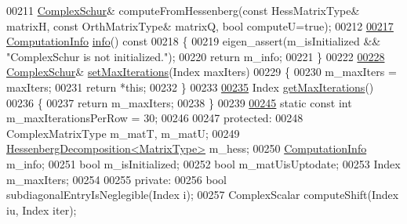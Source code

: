 \begin{DoxyCode}
00211     \hyperlink{group___eigenvalues___module_class_eigen_1_1_complex_schur}{ComplexSchur}& computeFromHessenberg(\textcolor{keyword}{const} HessMatrixType& matrixH, \textcolor{keyword}{const} OrthMatrixType& 
      matrixQ,  \textcolor{keywordtype}{bool} computeU=\textcolor{keyword}{true});
00212 
\hyperlink{group___eigenvalues___module_a8c5ee15fecfd126fc362c3f2fd28f51e}{00217}     \hyperlink{group__enums_ga85fad7b87587764e5cf6b513a9e0ee5e}{ComputationInfo} \hyperlink{group___eigenvalues___module_a8c5ee15fecfd126fc362c3f2fd28f51e}{info}()\textcolor{keyword}{ const}
00218 \textcolor{keyword}{    }\{
00219       eigen\_assert(m\_isInitialized && \textcolor{stringliteral}{"ComplexSchur is not initialized."});
00220       \textcolor{keywordflow}{return} m\_info;
00221     \}
00222 
\hyperlink{group___eigenvalues___module_a6ca227fbd5387f3a625351354b8eec44}{00228}     \hyperlink{group___eigenvalues___module_class_eigen_1_1_complex_schur}{ComplexSchur}& \hyperlink{group___eigenvalues___module_a6ca227fbd5387f3a625351354b8eec44}{setMaxIterations}(Index maxIters)
00229     \{
00230       m\_maxIters = maxIters;
00231       \textcolor{keywordflow}{return} *\textcolor{keyword}{this};
00232     \}
00233 
\hyperlink{group___eigenvalues___module_a2fc0b7bc409a49e7cdb7b6edcfff26eb}{00235}     Index \hyperlink{group___eigenvalues___module_a2fc0b7bc409a49e7cdb7b6edcfff26eb}{getMaxIterations}()
00236     \{
00237       \textcolor{keywordflow}{return} m\_maxIters;
00238     \}
00239 
\hyperlink{group___eigenvalues___module_a891e98fa0c95cb14896e8a2ffd7e4fe8}{00245}     \textcolor{keyword}{static} \textcolor{keyword}{const} \textcolor{keywordtype}{int} m\_maxIterationsPerRow = 30;
00246 
00247   \textcolor{keyword}{protected}:
00248     ComplexMatrixType m\_matT, m\_matU;
00249     \hyperlink{group___eigenvalues___module}{HessenbergDecomposition<MatrixType>} m\_hess;
00250     \hyperlink{group__enums_ga85fad7b87587764e5cf6b513a9e0ee5e}{ComputationInfo} m\_info;
00251     \textcolor{keywordtype}{bool} m\_isInitialized;
00252     \textcolor{keywordtype}{bool} m\_matUisUptodate;
00253     Index m\_maxIters;
00254 
00255   \textcolor{keyword}{private}:  
00256     \textcolor{keywordtype}{bool} subdiagonalEntryIsNeglegible(Index i);
00257     ComplexScalar computeShift(Index iu, Index iter);

\end{DoxyCode}
